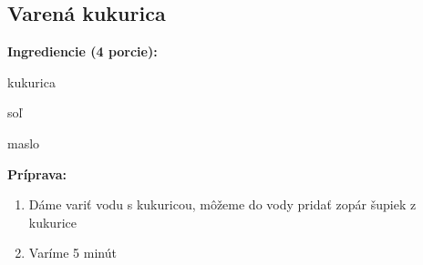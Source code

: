 \setcounter{step}{0}

\subsection{ Varená kukurica }

\begin{ingredient}
  
  \def\portions{  }
  \textbf{ {\normalsize Ingrediencie (4 porcie):} }

  \begin{main}
      \item kukurica
      \item soľ
      \item maslo
  \end{main}
  
\end{ingredient}
\begin{recipe}
\textbf{ {\normalsize Príprava:} }
\begin{enumerate}

  \item{Dáme variť vodu s kukuricou, môžeme do vody pridať zopár šupiek z kukurice}
  \item{Varíme 5 minút}

\end{enumerate}
\end{recipe}

\begin{notes}
  
\end{notes}	
\clearpage
